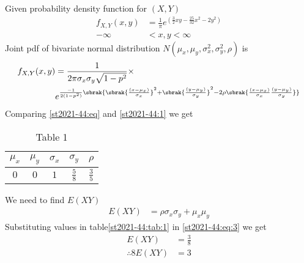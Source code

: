 
Given probability density function for $(X,Y)$
\begin{align}
f_{X,Y}(x,y)&=\frac{1}{\pi}e^{(\frac{3}{2}xy-\frac{25}{32}x^2-2y^2)} \label{st2021-44:1} \\ 
-\infty &< x,y < \infty
\end{align}
Joint pdf of bivariate normal distribution $N(\mu_x,\mu_y,\sigma_x^2,\sigma_y^2,\rho)$ is
\begin{align}
f_{X,Y}(x,y)&=\frac{1}{2\pi\sigma_x\sigma_y\sqrt{1-p^2}} \times \notag \\ &e^{\frac{-1}{2(1-p^2)}\sbrak{\sbrak{\frac{(x-\mu_x)}{\sigma_x}}^2+\sbrak{\frac{(y-\mu_y)}{\sigma_y}}^2-2\rho\sbrak{\frac{(x-\mu_x)}{\sigma_x}\frac{(y-\mu_y)}{\sigma_y}}}} \label{st2021-44:eq}
\end{align}
Comparing \eqref{st2021-44:eq} and \eqref{st2021-44:1} we get 
\begin{table}[h!]
\resizebox{7cm}{!}
{
\begin{tabular}{|c|c|c|c|c|}
\hline
$\mu_x$ & $\mu_y$ & $\sigma_x$ & $\sigma_y$ & $\rho$ \\
\hline
$0$ & $0$ & $1$ & $\frac{5}{8}$ & $\frac{3}{5}$\\
\hline
\end{tabular}
}
\caption{Table 1} 
\label{st2021-44:tab:1}
\end{table}
We need to find $E(XY)$
\begin{align}
E(XY)&=\rho \sigma_x\sigma_y+\mu_x\mu_y \label{st2021-44:eq:3}
\end{align}
Substituting values in table\eqref{st2021-44:tab:1} in \eqref{st2021-44:eq:3} we get
\begin{align}
E(XY)&=\frac{3}{8} \label{st2021-44:6}\\
\therefore 8E(XY)&=3
\end{align}